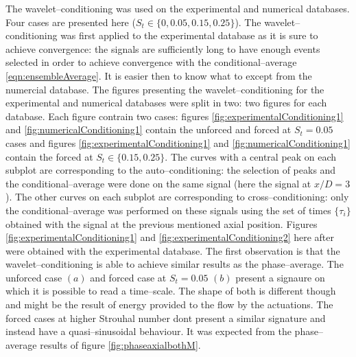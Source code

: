 \documentclass[english]{aiaa-tc}
\begin{document}
The wavelet--conditioning was used on the experimental and numerical databases. Four cases are presented here ($S_t \in \{0, 0.05, 0.15, 0.25\}$). The wavelet--conditioning was first applied to the experimental database as it is sure to achieve convergence: the signals are sufficiently long to have enough events selected in order to achieve convergence with the conditional--average \ref{eqn:ensembleAverage}. It is easier then to know what to except from the numercial database.
The figures presenting the wavelet--conditioning for the experimental and numerical databases were split in two: two figures for each database. Each figure contrain two cases: figures \ref{fig:experimentalConditioning1} and \ref{fig:numericalConditioning1} contain the unforced and forced at $S_t = 0.05$ cases
and figures \ref{fig:experimentalConditioning1} and \ref{fig:numericalConditioning1} contain the forced at $S_t \in \{0.15, 0.25\}$.
The curves with a central peak on each subplot are corresponding to the auto--conditioning: the selection of peaks and the conditional--average were done on the same signal (here the signal at $x/D = 3$). The other curves on each subplot are corresponding to cross--conditioning: only the conditional--average was performed on these signals using the set of times $\{\tau_{i}\}$ obtained with the signal at the previous mentioned axial position.
Figures \ref{fig:experimentalConditioning1} and \ref{fig:experimentalConditioning2} here after were obtained with the experimental database. The first observation is that the wavelet--conditioning is able to achieve similar results as the phase--average. The unforced case $(a)$ and forced case at $S_t = 0.05$ $(b)$ present a signaure on which it is possible to read a time--scale. The shape of both is different though and might be the result of energy provided to the flow by the actuations. The forced cases at higher Strouhal number dont present a similar signature and instead have a quasi--sinusoidal behaviour. It was expected from the phase--average results of figure \ref{fig:phaseaxialbothM}.
\end{document}
